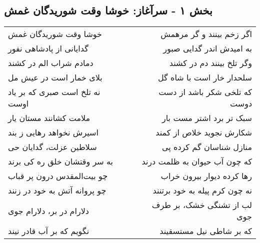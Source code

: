 \begin{center}
\section*{بخش ۱ - سرآغاز: خوشا وقت شوریدگان غمش}
\label{sec:001}
\begin{longtable}{l p{0.5cm} r}
خوشا وقت شوریدگان غمش
&&
اگر زخم بینند و گر مرهمش
\\
گدایانی از پادشاهی نفور
&&
به امیدش اندر گدایی صبور
\\
دمادم شراب الم در کشند
&&
وگر تلخ بینند دم در کشند
\\
بلای خمار است در عیش مل
&&
سلحدار خار است با شاه گل
\\
نه تلخ است صبری که بر یاد اوست
&&
که تلخی شکر باشد از دست دوست
\\
ملامت کشانند مستان یار
&&
سبک تر برد اشتر مست بار
\\
اسیرش نخواهد رهایی ز بند
&&
شکارش نجوید خلاص از کمند
\\
سلاطین عزلت، گدایان حی
&&
منازل شناسان گم کرده پی
\\
به سر وقتشان خلق ره کی برند
&&
که چون آب حیوان به ظلمت درند
\\
چو بیت‌المقدس درون پر قباب
&&
رها کرده دیوار بیرون خراب
\\
چو پروانه آتش به خود در زنند
&&
نه چون کرم پیله به خود برتنند
\\
دلارام در بر، دلارام جوی
&&
لب از تشنگی خشک، بر طرف جوی
\\
نگویم که بر آب قادر نیند
&&
که بر شاطی نیل مستسقیند
\\
\end{longtable}
\end{center}
